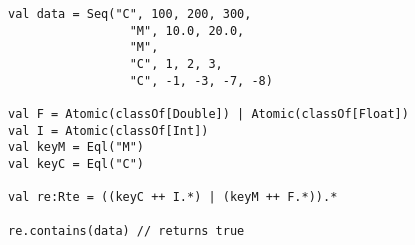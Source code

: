 \begin{lstlisting}[style=scalaioScala]
val data = Seq("C", 100, 200, 300,
                 "M", 10.0, 20.0,
                 "M",
                 "C", 1, 2, 3,
                 "C", -1, -3, -7, -8)

val F = Atomic(classOf[Double]) | Atomic(classOf[Float])
val I = Atomic(classOf[Int])
val keyM = Eql("M")
val keyC = Eql("C")

val re:Rte = ((keyC ++ I.*) | (keyM ++ F.*)).*

re.contains(data) // returns true
\end{lstlisting}
